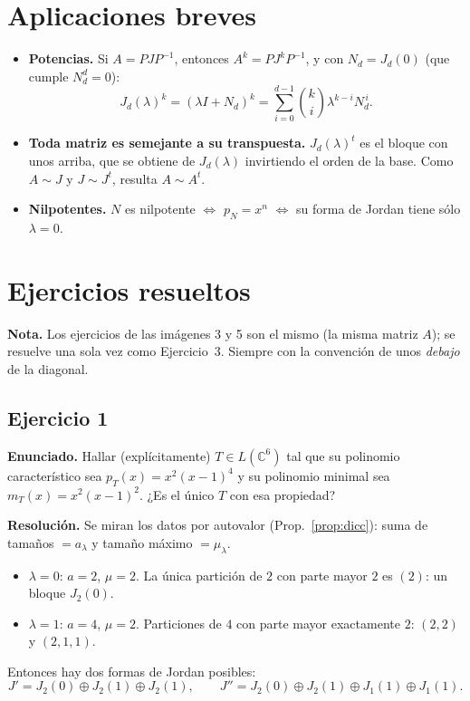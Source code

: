 \documentclass{article}
\newcommand{\C}{\mathbb{C}}
\theoremstyle{plain}
\theoremstyle{definition}
\theoremstyle{remark}
\begin{document}
\section{Aplicaciones breves}

\begin{itemize}
    \item \textbf{Potencias.} Si \(A=PJP^{-1}\), entonces \(A^k=PJ^kP^{-1}\), y con \(N_d=J_d(0)\) (que cumple \(N_d^d=0\)):
          \[
              J_d(\lambda)^k=(\lambda I+N_d)^k=\sum_{i=0}^{d-1}\binom ki\lambda^{k-i}N_d^{\,i}.
          \]
    \item \textbf{Toda matriz es semejante a su transpuesta.} \(J_d(\lambda)^t\) es el bloque con unos arriba, que se obtiene de \(J_d(\lambda)\) invirtiendo el orden de la base. Como \(A\sim J\) y \(J\sim J^t\), resulta \(A\sim A^t\).
    \item \textbf{Nilpotentes.} \(N\) es nilpotente \(\iff\) \(p_N=x^n\) \(\iff\) su forma de Jordan tiene sólo \(\lambda=0\).
\end{itemize}

\newpage
\section{Ejercicios resueltos}

\textbf{Nota.} Los ejercicios de las imágenes 3 y 5 son el mismo (la misma matriz \(A\)); se resuelve una sola vez como Ejercicio~3. Siempre con la convención de unos \emph{debajo} de la diagonal.

\subsection{Ejercicio 1}
\textbf{Enunciado.} Hallar (explícitamente) \(T\in L(\C^6)\) tal que su polinomio característico sea \(p_T(x)=x^2(x-1)^4\) y su polinomio minimal sea \(m_T(x)=x^2(x-1)^2\). ¿Es el único \(T\) con esa propiedad?

\textbf{Resolución.}
Se miran los datos por autovalor (Prop.~\ref{prop:dicc}): suma de tamaños \(=a_\lambda\) y tamaño máximo \(=\mu_\lambda\).
\begin{itemize}
    \item \(\lambda=0\): \(a=2\), \(\mu=2\). La única partición de \(2\) con parte mayor \(2\) es \((2)\): un bloque \(J_2(0)\).
    \item \(\lambda=1\): \(a=4\), \(\mu=2\). Particiones de \(4\) con parte mayor exactamente \(2\): \((2,2)\) y \((2,1,1)\).
\end{itemize}
Entonces hay dos formas de Jordan posibles:
\[
    J'=J_2(0)\oplus J_2(1)\oplus J_2(1),\qquad J''=J_2(0)\oplus J_2(1)\oplus J_1(1)\oplus J_1(1).
\]
\end{document}
